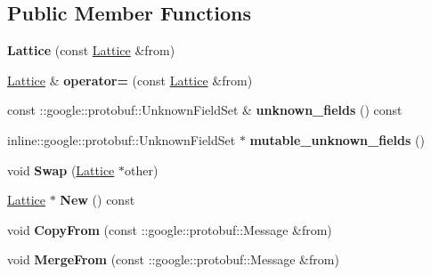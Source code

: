 \subsection*{Public Member Functions}
\begin{DoxyCompactItemize}
\item 
\hypertarget{classlattice_1_1Lattice_a6afe3eb36c5fa648ee09ff3425544a9f}{
{\bfseries Lattice} (const \hyperlink{classlattice_1_1Lattice}{Lattice} \&from)}
\label{classlattice_1_1Lattice_a6afe3eb36c5fa648ee09ff3425544a9f}

\item 
\hypertarget{classlattice_1_1Lattice_aaa4fc56dd3fca09222c685f78e2c5632}{
\hyperlink{classlattice_1_1Lattice}{Lattice} \& {\bfseries operator=} (const \hyperlink{classlattice_1_1Lattice}{Lattice} \&from)}
\label{classlattice_1_1Lattice_aaa4fc56dd3fca09222c685f78e2c5632}

\item 
\hypertarget{classlattice_1_1Lattice_afc9d0408a25d079574a8da841f4d2580}{
const ::google::protobuf::UnknownFieldSet \& {\bfseries unknown\_\-fields} () const }
\label{classlattice_1_1Lattice_afc9d0408a25d079574a8da841f4d2580}

\item 
\hypertarget{classlattice_1_1Lattice_a5581cb64b246c378c56bb2d686e42132}{
inline::google::protobuf::UnknownFieldSet $\ast$ {\bfseries mutable\_\-unknown\_\-fields} ()}
\label{classlattice_1_1Lattice_a5581cb64b246c378c56bb2d686e42132}

\item 
\hypertarget{classlattice_1_1Lattice_ab4a3958ab2281dfb4677e6b7998b5ff3}{
void {\bfseries Swap} (\hyperlink{classlattice_1_1Lattice}{Lattice} $\ast$other)}
\label{classlattice_1_1Lattice_ab4a3958ab2281dfb4677e6b7998b5ff3}

\item 
\hypertarget{classlattice_1_1Lattice_a947785986676e868ef33b975e406c14b}{
\hyperlink{classlattice_1_1Lattice}{Lattice} $\ast$ {\bfseries New} () const }
\label{classlattice_1_1Lattice_a947785986676e868ef33b975e406c14b}

\item 
\hypertarget{classlattice_1_1Lattice_a9aec9f61f02b520348f5b4e661f779ac}{
void {\bfseries CopyFrom} (const ::google::protobuf::Message \&from)}
\label{classlattice_1_1Lattice_a9aec9f61f02b520348f5b4e661f779ac}

\item 
\hypertarget{classlattice_1_1Lattice_a62644d01e4c7fc503661a3ac7a4461aa}{
void {\bfseries MergeFrom} (const ::google::protobuf::Message \&from)}
\label{classlattice_1_1Lattice_a62644d01e4c7fc503661a3ac7a4461aa}


\end{DoxyCompactItemize}
